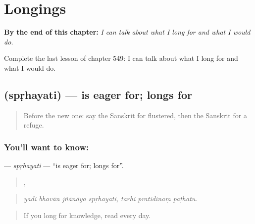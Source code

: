 
\chapter{Longings}
\label{ch:sa-longings}

\begin{chapteropening}
\textbf{By the end of this chapter:} \emph{I can talk about what I long for and what I would do.}

Complete the last lesson of chapter 549: I can talk about what I long for and what I would do.
\end{chapteropening}

\section[\texorpdfstring{\sk{स्पृहयति} (spṛhayati)}{स्पृहयति (spṛhayati)}]{ (spṛhayati) — is eager for; longs for}

\label{lesson:SA-C549-sprhayati}



\begin{quote}
Before the new one: say the Sanskrit for flustered, then the Sanskrit for a refuge.
\end{quote}

\subsection*{You'll want to know: }
\textbf{} — \emph{spṛhayati} — \textquotedblleft{}is eager for; longs for\textquotedblright{}.

\begin{quote}
   ,   
\end{quote}

\begin{quote}
\emph{yadi bhavān jñānāya spṛhayati, tarhi pratidinaṃ paṭhatu.}
\end{quote}

\begin{quote}
If you long for knowledge, read every day.
\end{quote}

